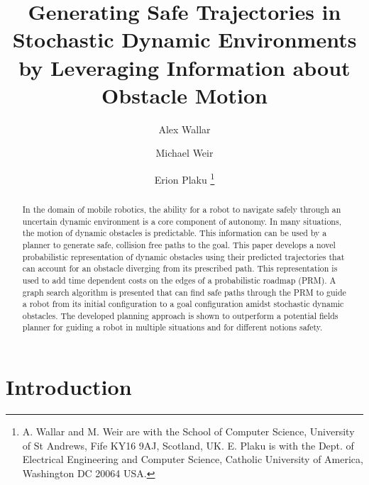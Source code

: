 \documentclass[letterpaper, 10pt, conference]{ieeeconf}
\begin{document}
\title{Generating Safe Trajectories in Stochastic Dynamic Environments by
Leveraging Information about Obstacle Motion}


\author{Alex Wallar \and Michael Weir \and Erion Plaku
\thanks{A. Wallar and M. Weir are with the School of Computer Science,
  University of St Andrews, Fife KY16 9AJ, Scotland, UK. E. Plaku is with the
  Dept. of Electrical Engineering and Computer Science, Catholic
  University of America, Washington DC 20064 USA.
}}

\maketitle

\begin{abstract}

    In the domain of mobile robotics, the ability for a robot to navigate
    safely through an uncertain dynamic environment is a core component of
    autonomy.  In many situations, the motion of dynamic obstacles is
    predictable. This information can be used by a planner to generate safe,
    collision free paths to the goal. This paper develops a novel probabilistic
    representation of dynamic obstacles using their predicted trajectories that
    can account for an obstacle diverging from its prescribed path. This
    representation is used to add time dependent costs on the edges of a
    probabilistic roadmap (PRM). A graph search algorithm is presented that can
    find safe paths through the PRM to guide a robot from its initial
    configuration to a goal configuration amidst stochastic dynamic obstacles.
    The developed planning approach is shown to outperform a potential fields
    planner for guiding a robot in multiple situations and for different
    notions safety.

\end{abstract}


\section{Introduction}

\label{chapter:introduction}
\end{document}
